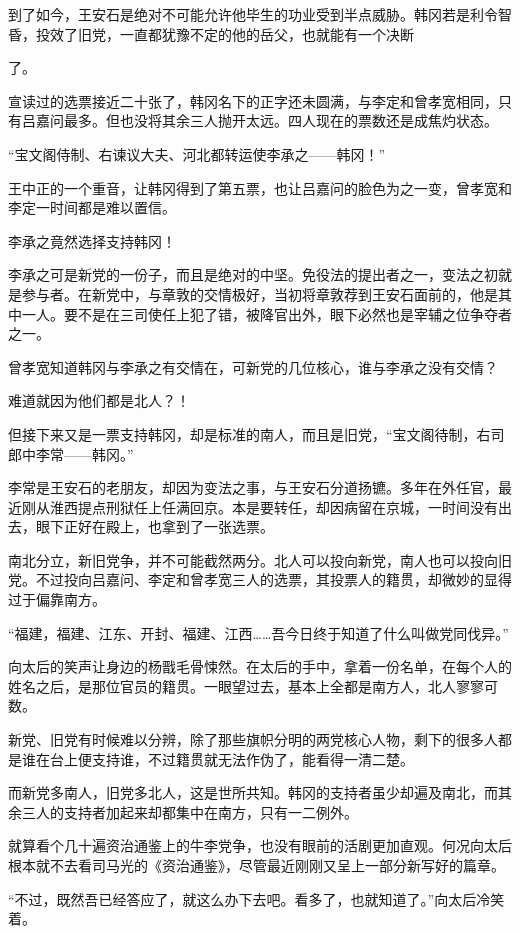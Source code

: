 到了如今，王安石是绝对不可能允许他毕生的功业受到半点威胁。韩冈若是利令智昏，投效了旧党，一直都犹豫不定的他的岳父，也就能有一个决断

了。

宣读过的选票接近二十张了，韩冈名下的正字还未圆满，与李定和曾孝宽相同，只有吕嘉问最多。但也没将其余三人抛开太远。四人现在的票数还是成焦灼状态。

“宝文阁侍制、右谏议大夫、河北都转运使李承之——韩冈！”

王中正的一个重音，让韩冈得到了第五票，也让吕嘉问的脸色为之一变，曾孝宽和李定一时间都是难以置信。

李承之竟然选择支持韩冈！

李承之可是新党的一份子，而且是绝对的中坚。免役法的提出者之一，变法之初就是参与者。在新党中，与章敦的交情极好，当初将章敦荐到王安石面前的，他是其中一人。要不是在三司使任上犯了错，被降官出外，眼下必然也是宰辅之位争夺者之一。

曾孝宽知道韩冈与李承之有交情在，可新党的几位核心，谁与李承之没有交情？

难道就因为他们都是北人？！

但接下来又是一票支持韩冈，却是标准的南人，而且是旧党，“宝文阁待制，右司郎中李常——韩冈。”

李常是王安石的老朋友，却因为变法之事，与王安石分道扬镳。多年在外任官，最近刚从淮西提点刑狱任上任满回京。本是要转任，却因病留在京城，一时间没有出去，眼下正好在殿上，也拿到了一张选票。

南北分立，新旧党争，并不可能截然两分。北人可以投向新党，南人也可以投向旧党。不过投向吕嘉问、李定和曾孝宽三人的选票，其投票人的籍贯，却微妙的显得过于偏靠南方。

“福建，福建、江东、开封、福建、江西……吾今日终于知道了什么叫做党同伐异。”

向太后的笑声让身边的杨戬毛骨悚然。在太后的手中，拿着一份名单，在每个人的姓名之后，是那位官员的籍贯。一眼望过去，基本上全都是南方人，北人寥寥可数。

新党、旧党有时候难以分辨，除了那些旗帜分明的两党核心人物，剩下的很多人都是谁在台上便支持谁，不过籍贯就无法作伪了，能看得一清二楚。

而新党多南人，旧党多北人，这是世所共知。韩冈的支持者虽少却遍及南北，而其余三人的支持者加起来却都集中在南方，只有一二例外。

就算看个几十遍资治通鉴上的牛李党争，也没有眼前的活剧更加直观。何况向太后根本就不去看司马光的《资治通鉴》，尽管最近刚刚又呈上一部分新写好的篇章。

“不过，既然吾已经答应了，就这么办下去吧。看多了，也就知道了。”向太后冷笑着。

